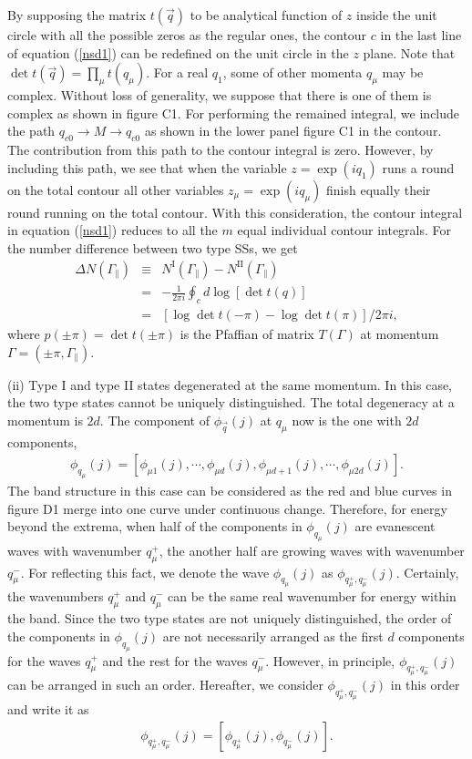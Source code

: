 \documentclass[aps,pra,amsmath,twocolumn,showpacs,bibnotes,10pt]{revtex4-1}
\begin{document}
By supposing the matrix $t(\vec q)$ to be analytical function of $z$ inside the unit circle with all the possible zeros as the regular ones, the contour $c$ in the last line of equation (\ref{nsd1}) can be redefined on the unit circle in the $z$ plane. Note that $\det t(\vec q)=\prod_{\mu} t(q_{\mu})$. For a real $q_1$, some of other momenta $q_{\mu}$ may be complex. Without loss of generality, we suppose that there is one of them is complex as shown in figure C1. For performing the remained integral, we include the path $q_{c0} \to M \to q_{c0}$ as shown in the lower panel figure C1 in the contour. The contribution from this path to the contour integral is zero. However, by including this path, we see that when the variable $z = \exp(iq_1)$ runs a round on the total contour all other variables $z_{\mu} = \exp(iq_{\mu})$ finish equally their round running on the total contour. With this consideration, the contour integral in equation (\ref{nsd1}) reduces to all the $m$ equal individual contour integrals. For the number difference between two type SSs, we get
\begin{eqnarray}
\Delta N(\Gamma_{\parallel}) &\equiv& N^{\text{I}}(\Gamma_{\parallel})-N^{\text{II}}(\Gamma_{\parallel}) \nonumber\\
&=& -\frac{1}{2\pi i}\oint_{c}d\log [\det t(q)]   \nonumber\\
&=& [\log\det t(-\pi)-\log\det t(\pi)]/2\pi i,   \label{nsrf2}
\end{eqnarray}
where $p(\pm\pi) = \det t(\pm\pi)$ is the Pfaffian of matrix $T(\Gamma)$ at momentum $\Gamma = (\pm\pi,\Gamma_{\parallel})$.
 
(ii) Type I and type II states degenerated at the same momentum. In this case, the two type states cannot be uniquely distinguished. The total degeneracy at a momentum is $2d$. The component of $\phi_{\vec q}(j)$ at $q_{\mu}$ now is the one with $2d$ components, 
\begin{eqnarray}
\phi_{q_{\mu}}(j)= [\phi_{\mu 1}(j),\cdots,\phi_{\mu d}(j),\phi_{\mu d+1}(j),\cdots,\phi_{\mu 2d}(j)]. \nonumber 
\end{eqnarray}
The band structure in this case can be considered as the red and blue curves in figure D1 merge into one curve under continuous change. Therefore, for energy beyond the extrema, when half of the components in $\phi_{q_{\mu}}(j)$ are evanescent waves with wavenumber $q^+_{\mu}$, the another half are growing waves with wavenumber $q^-_{\mu}$. For reflecting this fact, we denote the wave $\phi_{q_{\mu}}(j)$ as $\phi_{q^+_{\mu},q^-_{\mu}}(j)$. Certainly, the wavenumbers $q^+_{\mu}$ and $q^-_{\mu}$ can be the same real wavenumber for energy within the band. Since the two type states are not uniquely distinguished, the order of the components in $\phi_{q_{\mu}}(j)$ are not necessarily arranged as the first $d$ components for the waves $q^+_{\mu}$ and the rest for the waves $q^-_{\mu}$. However, in principle, $\phi_{q^+_{\mu},q^-_{\mu}}(j)$ can be arranged in such an order. Hereafter, we consider $\phi_{q^+_{\mu},q^-_{\mu}}(j)$ in this order and write it as
\begin{eqnarray}
\phi_{q^+_{\mu},q^-_{\mu}}(j) = [\phi_{q^+_{\mu}}(j), \phi_{q^-_{\mu}}(j)].
\end{eqnarray}
\end{document}

